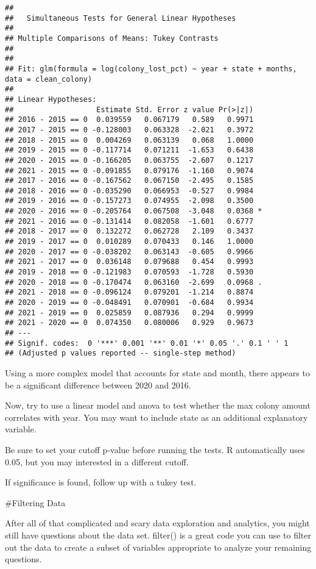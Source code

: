 \documentclass[
]{article}
\begin{document}
\begin{verbatim}
## 
##   Simultaneous Tests for General Linear Hypotheses
## 
## Multiple Comparisons of Means: Tukey Contrasts
## 
## 
## Fit: glm(formula = log(colony_lost_pct) ~ year + state + months, data = clean_colony)
## 
## Linear Hypotheses:
##                   Estimate Std. Error z value Pr(>|z|)  
## 2016 - 2015 == 0  0.039559   0.067179   0.589   0.9971  
## 2017 - 2015 == 0 -0.128003   0.063328  -2.021   0.3972  
## 2018 - 2015 == 0  0.004269   0.063139   0.068   1.0000  
## 2019 - 2015 == 0 -0.117714   0.071211  -1.653   0.6438  
## 2020 - 2015 == 0 -0.166205   0.063755  -2.607   0.1217  
## 2021 - 2015 == 0 -0.091855   0.079176  -1.160   0.9074  
## 2017 - 2016 == 0 -0.167562   0.067150  -2.495   0.1585  
## 2018 - 2016 == 0 -0.035290   0.066953  -0.527   0.9984  
## 2019 - 2016 == 0 -0.157273   0.074955  -2.098   0.3500  
## 2020 - 2016 == 0 -0.205764   0.067508  -3.048   0.0368 *
## 2021 - 2016 == 0 -0.131414   0.082058  -1.601   0.6777  
## 2018 - 2017 == 0  0.132272   0.062728   2.109   0.3437  
## 2019 - 2017 == 0  0.010289   0.070433   0.146   1.0000  
## 2020 - 2017 == 0 -0.038202   0.063143  -0.605   0.9966  
## 2021 - 2017 == 0  0.036148   0.079688   0.454   0.9993  
## 2019 - 2018 == 0 -0.121983   0.070593  -1.728   0.5930  
## 2020 - 2018 == 0 -0.170474   0.063160  -2.699   0.0968 .
## 2021 - 2018 == 0 -0.096124   0.079201  -1.214   0.8874  
## 2020 - 2019 == 0 -0.048491   0.070901  -0.684   0.9934  
## 2021 - 2019 == 0  0.025859   0.087936   0.294   0.9999  
## 2021 - 2020 == 0  0.074350   0.080006   0.929   0.9673  
## ---
## Signif. codes:  0 '***' 0.001 '**' 0.01 '*' 0.05 '.' 0.1 ' ' 1
## (Adjusted p values reported -- single-step method)
\end{verbatim}

Using a more complex model that accounts for state and month, there
appears to be a significant difference between 2020 and 2016.

Now, try to use a linear model and anova to test whether the max colony
amount correlates with year. You may want to include state as an
additional explanatory variable.

Be sure to set your cutoff p-value before running the tests. R
automatically uses 0.05, but you may interested in a different cutoff.

If significance is found, follow up with a tukey test.

\#Filtering Data

After all of that complicated and scary data exploration and analytics,
you might still have questions about the data set. filter() is a great
code you can use to filter out the data to create a subset of variables
appropriate to analyze your remaining questions.
\end{document}
